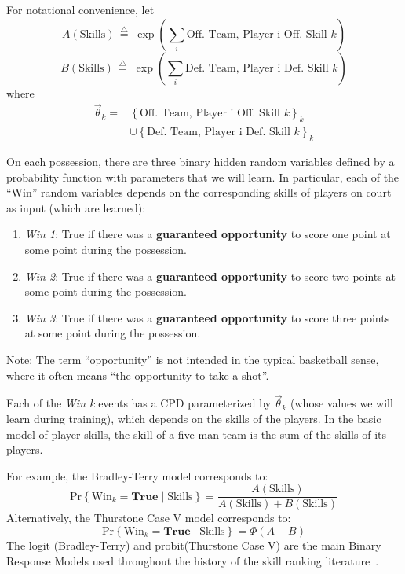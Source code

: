 \documentclass[10pt,twocolumn]{article}
\newcommand{\prb}[1]{\ensuremath{  \mathrm{Pr}\left\{ #1 \right\}  }}
\newcommand{\tridefeq}{\ensuremath{  \,{\overset{\triangle}{=}}\;   }}
\begin{document}
For notational convenience, let
\[
A\left(\mathrm{Skills}\right) \tridefeq \exp \left( \sum_i \textrm{Off. Team, Player i Off. Skill } k \right)
\]%
\[
B\left(\mathrm{Skills}\right) \tridefeq  \exp \left( \sum_i \textrm{Def. Team, Player i Def. Skill } k \right)
\]%
where
\begin{align*}
\vec \theta_k =& \left\{\textrm{Off. Team, Player i Off. Skill } k\right\}_k
\\             &\cup \left\{\textrm{Def. Team, Player i Def. Skill } k\right\}_k
\end{align*}%

On each possession, there are three binary hidden random variables defined by a probability function with parameters that we will learn. In particular, each of the ``Win'' random variables depends on the corresponding skills of players on court as input (which are learned):
\begin{enumerate}
\item \emph{Win 1}: True if there was a {\bf guaranteed opportunity} to score one point at some point during the possession.
\item \emph{Win 2}: True if there was a {\bf guaranteed opportunity} to score two points at some point during the possession.
\item \emph{Win 3}: True if there was a {\bf guaranteed opportunity} to score three points at some point during the possession.
\end{enumerate}
Note: The term ``opportunity'' is not intended in the typical basketball sense, where it often means ``the opportunity to take a shot''.


Each of the \emph{Win k} events has a CPD parameterized by $\vec \theta_k$ (whose values we will learn during training), which depends on the skills of the players.
In the basic model of player skills, the skill of a five-man team is the sum of the skills of its players.

For example, the Bradley-Terry model corresponds to:
\[
\prb{\mathrm{Win}_k = \mathbf{True} \mid \mathrm{Skills} } = \frac{ A\left(\mathrm{Skills}\right) } { A\left(\mathrm{Skills}\right) + B\left(\mathrm{Skills}\right) }
\]%
Alternatively, the Thurstone Case V model corresponds to:
\[
\prb{\mathrm{Win}_k = \mathbf{True} \mid \mathrm{Skills} } = \Phi\left( A - B \right)
\]%
The logit (Bradley-Terry) and probit(Thurstone Case V) are the main Binary Response Models used throughout the history of the skill ranking literature~\cite{elo1978rating,glickman1999parameter,herbrich2007trueskilltm,coulom2008whole}.
\end{document}
